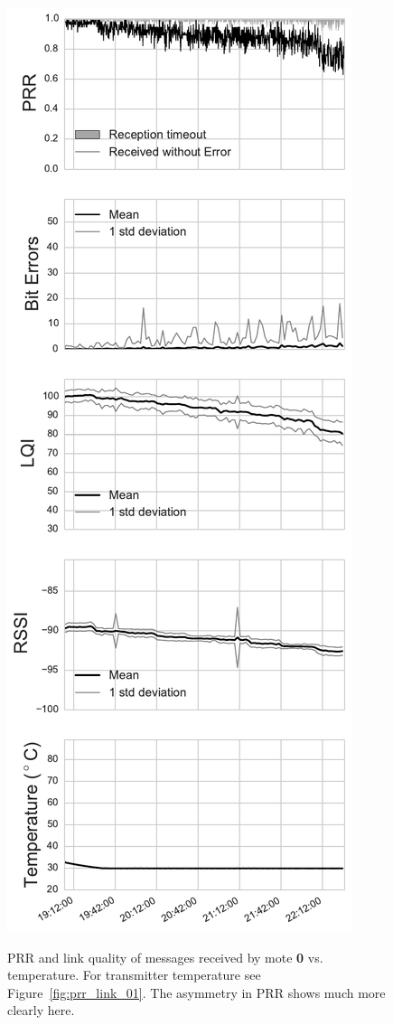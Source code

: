 \begin{figure}[t]
{		\includegraphics[width=0.475\columnwidth]{figures/prr_1-0_transmitter}
		\label{fig:prr_link_10_transmitter}
	}
	\caption{\acs{PRR} and link quality of messages received by mote \textbf{0} vs. temperature.  For transmitter temperature see Figure~\ref{fig:prr_link_01}. The asymmetry in \acs{PRR} shows much more clearly here.}
	\label{fig:prr_link_10}
\end{figure}

